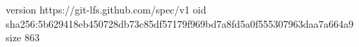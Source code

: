version https://git-lfs.github.com/spec/v1
oid sha256:5b629418eb450728db73c85df57179f969bd7a8fd5a0f555307963daa7a664a9
size 863
